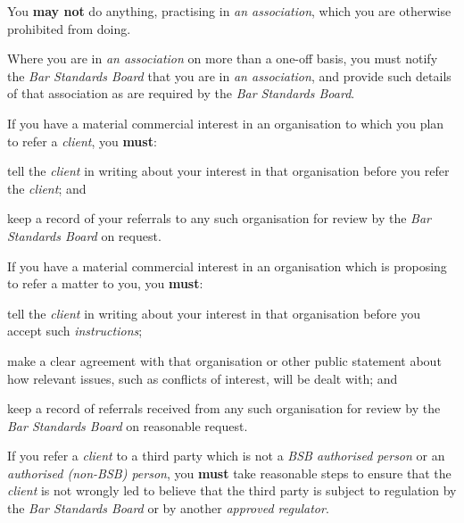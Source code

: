
You \textcolor{myred}{\textbf{may not}} do anything, practising in \emph{an association}, which you
are otherwise prohibited from doing.


Where you are in \emph{an association} on more than a one-off basis, you
must notify the \emph{Bar Standards Board} that you are in \emph{an
association}, and provide such details of that association as are
required by the \emph{Bar Standards Board}.


If you have a material commercial interest in an organisation to which
you plan to refer a \emph{client}, you \textcolor{myred}{\textbf{must}}:
\begin{numlist}\item tell the \emph{client} in writing about your interest in that
organisation before you refer the \emph{client}; and
\item keep a record of your referrals to any such organisation for review
by the \emph{Bar Standards Board} on request.
\end{numlist}

If you have a material commercial interest in an organisation which is
proposing to refer a matter to you, you \textcolor{myred}{\textbf{must}}:

\begin{numlist}\item tell the \emph{client} in writing about your interest in that
organisation before you accept such \emph{instructions};

\item make a clear agreement with that organisation or other public
statement about how relevant issues, such as conflicts of interest, will
be dealt with; and

\item keep a record of referrals received from any such organisation for
review by the \emph{Bar Standards Board} on reasonable request.\end{numlist}


If you refer a \emph{client} to a third party which is not a \emph{BSB
authorised person} or an \emph{authorised (non-BSB) person}, you \textcolor{myred}{\textbf{must}}
take reasonable steps to ensure that the \emph{client} is not wrongly
led to believe that the third party is subject to regulation by the
\emph{Bar Standards Board} or by another \emph{approved regulator}.

